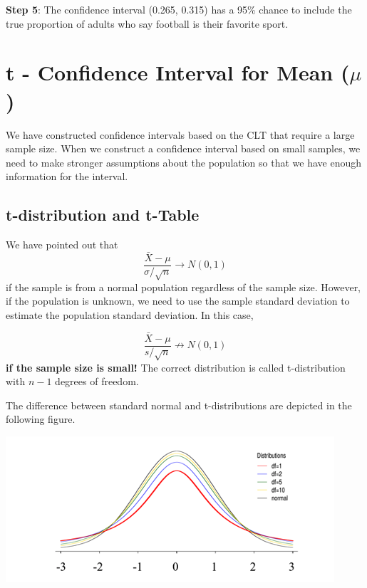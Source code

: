 \documentclass[
]{book}
\begin{document}
\textbf{Step 5}: The confidence interval (0.265, 0.315) has a 95\% chance to include the true proportion of adults who say football is their favorite sport.

\hfill\break

\hypertarget{t---confidence-interval-for-mean-mu}{%
\section{\texorpdfstring{t - Confidence Interval for Mean (\(\mu\))}{t - Confidence Interval for Mean (\textbackslash mu)}}\label{t---confidence-interval-for-mean-mu}}

We have constructed confidence intervals based on the CLT that require a large sample size. When we construct a confidence interval based on small samples, we need to make stronger assumptions about the population so that we have enough information for the interval.

\hypertarget{t-distribution-and-t-table}{%
\subsection{t-distribution and t-Table}\label{t-distribution-and-t-table}}

We have pointed out that
\[
\frac{\bar{X} - \mu}{\sigma/\sqrt{n}} \to N(0, 1)
\]
if the sample is from a normal population regardless of the sample size. However, if the population is unknown, we need to use the sample standard deviation to estimate the population standard deviation. In this case,

\[
\frac{\bar{X} - \mu}{s/\sqrt{n}} \not \rightarrow N(0, 1)
\]
\textbf{if the sample size is small!} The correct distribution is called t-distribution with \(n-1\) degrees of freedom.

The difference between standard normal and t-distributions are depicted in the following figure.

\begin{center}\includegraphics[width=0.8\linewidth]{week07/t-Dist} \end{center}
\end{document}
